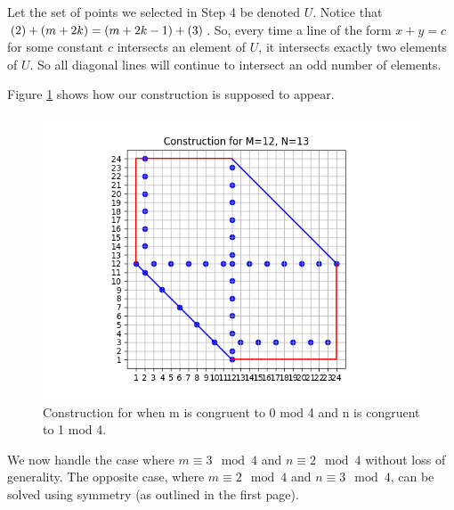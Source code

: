 \documentclass[10pt]{../usamts}
\begin{document}
\begin{solution}
\begin{enumerate}
    Let the set of points we selected in Step 4 be denoted $U$. Notice that $\left( 2 \right)+\left( m+2k \right) = \left( m+2k-1 \right)+\left( 3 \right)$. So, every time a line of the form $x+y=c$ for some constant $c$ intersects an element of $U$, it intersects exactly two elements of $U$. So all diagonal lines will continue to intersect an odd number of elements.
\end{enumerate}
Figure \ref{fig:zerooneconstruct} shows how our construction is supposed to appear.

\begin{figure}[htbp]
\centering
    \includegraphics[width=12cm]{round2/p5construct/construct_12_13.png}
    \caption{Construction for when m is congruent to 0 mod 4 and n is congruent to 1 mod 4.}
    \label{fig:zerooneconstruct}
\end{figure}

\clearpage
We now handle the case where $m \equiv 3 \mod 4$ and $n \equiv 2 \mod 4$ without loss of generality. The opposite case, where $m \equiv 2 \mod 4$ and $n \equiv 3 \mod 4$, can be solved using symmetry (as outlined in the first page).


\end{solution}
\end{document}
